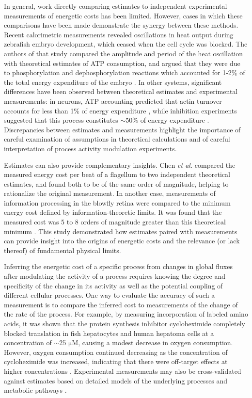 \documentclass{compactarticle}
\begin{document}
In general, work directly comparing estimates to independent experimental measurements of energetic costs has been limited. However, cases in which these comparisons have been made demonstrate the synergy between these methods. Recent calorimetric measurements revealed oscillations in heat output during zebrafish embryo development, which ceased when the cell cycle was blocked. The authors of that study compared the amplitude and period of the heat oscillation with theoretical estimates of ATP consumption, and argued that they were due to phosphorylation and dephosphorylation reactions which accounted for 1-2\% of the total energy expenditure of the embryo \cite{rodenfels_heat_2019}. In other systems, significant differences have been observed between theoretical estimates and experimental measurements: in neurons, ATP accounting predicted that actin turnover accounts for less than 1\% of energy expenditure \cite{engl2015non}, while inhibition experiments suggested that this process constitutes $\sim$50\% of energy expenditure \cite{bernstein2003actin}. Discrepancies between estimates and measurements highlight the importance of careful examination of assumptions in theoretical calculations and of careful interpretation of process activity modulation experiments. 

Estimates can also provide complementary insights. Chen \textit{et al.} \cite{chen_atp_2015} compared the measured energy cost per beat of a flagellum to two independent theoretical estimates, and found both to be of the same order of magnitude, helping to rationalize the original measurement. In another case, measurements of information processing in the blowfly retina were compared to the minimum energy cost defined by information-theoretic limits. It was found that the measured cost was 5 to 8 orders of magnitude greater than this theoretical minimum \cite{laughlin_metabolic_1998}. This study demonstrated how estimates paired with measurements can provide insight into the origins of energetic costs and the relevance (or lack thereof) of fundamental physical limits. 

Inferring the energetic cost of a specific process from changes in global fluxes after modulating the activity of a process requires knowing the degree and specificity of the change in its activity as well as the potential coupling of different cellular processes. One way to evaluate the accuracy of such a measurement is to compare the inferred cost to measurements of the change of the rate of the process. For example, by measuring incorporation of labeled amino acids, it was shown that the protein synthesis inhibitor cycloheximide completely blocked translation in fish hepatocytes and human hepatoma cells at a concentration of $\sim$25 $\mathrm{\mu}$M, causing a modest decrease in oxygen consumption. However, oxygen consumption continued decreasing as the concentration of cycloheximide was increased, indicating that there were off-target effects at higher concentrations \cite{wieser2001hierarchies}. Experimental measurements may also be cross-validated against estimates based on detailed models of the underlying processes and metabolic pathways \cite{laughlin_metabolic_1998,mahmoudabadi_energetic_2017,lynch_bioenergetic_2015,stouthamer1973theoretical}.
\end{document}
